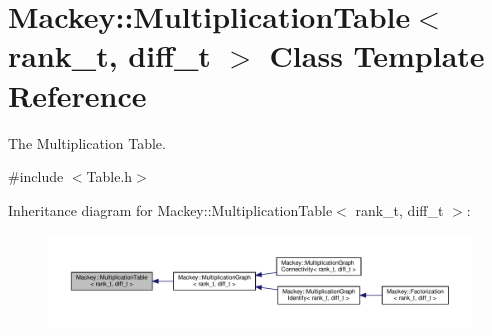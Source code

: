 \hypertarget{classMackey_1_1MultiplicationTable}{}\section{Mackey\+:\+:Multiplication\+Table$<$ rank\+\_\+t, diff\+\_\+t $>$ Class Template Reference}
\label{classMackey_1_1MultiplicationTable}


The Multiplication Table.  




{\ttfamily \#include $<$Table.\+h$>$}



Inheritance diagram for Mackey\+:\+:Multiplication\+Table$<$ rank\+\_\+t, diff\+\_\+t $>$\+:\nopagebreak
\begin{figure}[H]
\begin{center}
\leavevmode
\includegraphics[width=350pt]{classMackey_1_1MultiplicationTable__inherit__graph}
\end{center}
\end{figure}
